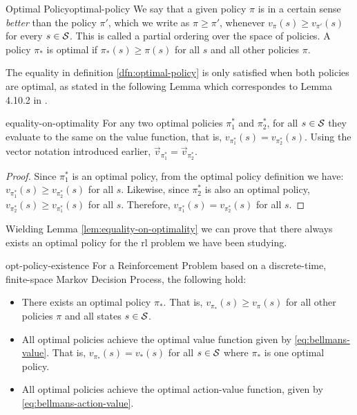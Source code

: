 \begin{dfn}{Optimal Policy}{optimal-policy}
    We say that a given policy $\pi$ is in a certain sense \textit{better} than
    the policy $\pi'$, which we write as $\pi \geq \pi'$, whenever $v_\pi(s)
    \geq v_{\pi'} (s)$ for every $s \in \mathcal{S}$. This is called a partial
    ordering over the space of policies. A policy $\pi_*$ is optimal if
    $\pi_*(s) \geq \pi (s)$ for all $s$ and all other policies $\pi$.
\end{dfn}

The equality in definition \ref{dfn:optimal-policy} is only satisfied when both
policies are optimal, as stated in the following Lemma which correspondes to
Lemma 4.10.2 in \cite[pg.~115]{raoRL4F}.

\begin{lemma}{}{equality-on-optimality}
    For any two optimal policies $\pi^{*}_{1}$ and $\pi^{*}_{2}$, for all $s \in
    \mathcal{S}$ they evaluate to the same on the value function, that is,
    $v_{\pi^{*}_{1}} (s) = v_{\pi^{*}_{2}} (s)$.  Using the vector notation
    introduced earlier, $\vec{v}_{\pi_{1}^{*}} = \vec{v}_{\pi_{2}^{*}}$.
\end{lemma}

\begin{proof}
    Since $\pi_{1}^{*}$ is an optimal policy, from the optimal policy definition
    we have: $v_{\pi_{1}^{*}}(s) \geq v_{\pi_{2}^{*}} (s)$ for all $s$.
    Likewise, since $\pi_{2}^{*}$ is also an optimal policy, $v_{\pi_{2}^{*}}(s)
    \geq v_{\pi_{1}^{*}} (s)$ for all $s$. Therefore, $v_{\pi_{1}^{*}}(s) =
    v_{\pi_{2}^{*}} (s)$ for all $s$.
\end{proof}

Wielding Lemma \ref{lem:equality-on-optimality} we can prove that there always
exists an optimal policy for the \ac{rl} problem we have been studying.

\begin{thrm}{}{opt-policy-existence}
    For a Reinforcement Problem based on a discrete-time, finite-space Markov
    Decision Process, the following hold:
    \begin{itemize}
        \item There exists an optimal policy $\pi_*$. That is, $v_{\pi_*} (s)
            \geq v_{\pi}(s)$ for all other policies $\pi$ and all states $s \in
            \mathcal{S}$.
        \item All optimal policies achieve the optimal value function given by
            \eqref{eq:bellmans-value}. That is, $v_{\pi_*}(s) = v_* (s)$ for all
            $s \in \mathcal{S}$ where $\pi_*$ is one optimal policy.
        \item All optimal policies achieve the optimal action-value function,
            given by \eqref{eq:bellmans-action-value}.
    \end{itemize}
\end{thrm}

